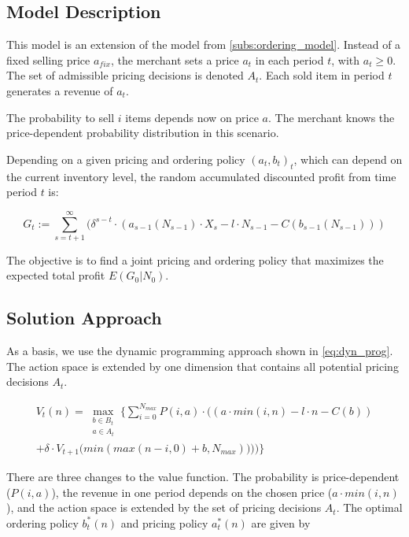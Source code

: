 \subsection{Model Description}
\label{subs:joint_model}
This model is an extension of the model from \cref{subs:ordering_model}.
Instead of a fixed selling price $a_{fix}$, the merchant sets a price $a_t$ in each period $t$, with $a_t \geq 0$.
The set of admissible pricing decisions is denoted $A_t$.
Each sold item in period $t$ generates a revenue of $a_t$.

The probability to sell $i$ items depends now on price $a$.
The merchant knows the price-dependent probability distribution in this scenario.

Depending on a given pricing and ordering policy $(a_t, b_t)_t$, which can depend on the current inventory level, the random accumulated discounted profit from time period $t$ is:

$$
G_t := \sum_{s=t+1}^{\infty} (\delta^{s-t} \cdot (a_{s-1}(N_{s-1}) \cdot X_s - l \cdot N_{s-1} - C(b_{s-1}(N_{s-1})))
$$

The objective is to find a joint pricing and ordering policy that maximizes the expected total profit $E(G_0 | N_0)$.

\subsection{Solution Approach}
\label{section:joint_solution}
As a basis, we use the dynamic programming approach shown in \cref{eq:dyn_prog}.
The action space is extended by one dimension that contains all potential pricing decisions $A_t$.

\begin{equation}
\begin{split}
V_t(n) = \max_{\substack{b \in B_t \\ a \in A_t}} \Bigg\{
\sum_{i = 0}^{N_{max}}
P(i, a) \cdot \Big((
a \cdot min(i, n) %
- l \cdot n %
- C(b) %
) \\
+ \delta \cdot V_{t+1}\big(min(max(n - i, 0) + b, N_{max}))\big)
\Big)\Bigg\}
\end{split}
\label{eq:dyn_prog_joint}
\end{equation}

There are three changes to the value function.
The probability is price-dependent ($P(i, a)$), the revenue in one period depends on the chosen price ($a \cdot min(i, n)$), and the action space is extended by the set of pricing decisions $A_t$.
The optimal ordering policy $b^*_t(n)$ and pricing policy $a^*_t(n)$ are given by

